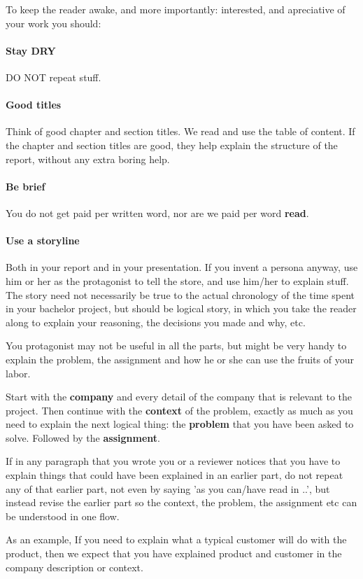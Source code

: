 To keep the reader awake, and more importantly: interested, and apreciative of your work you should:
\paragraph{Stay DRY} DO NOT repeat stuff.
\paragraph{Good titles} Think of good chapter and section titles. We read and use the table of content. If the chapter and section titles are good, they help explain the structure of the report, without any extra boring help.
\paragraph{Be brief} You do not get paid per written word, nor are we paid per word \textbf{read}.
\paragraph{Use a storyline} Both in your report and in your presentation. If you invent a persona anyway, use him or her as the protagonist to tell the store, and use him/her to explain stuff.
The story need not necessarily be true to the actual chronology of the time spent in your bachelor project, but should be logical story, in which you take the reader along to explain your reasoning, the decisions you made and why, etc.

You protagonist may not be useful in all the parts, but might be very handy to explain the problem, the assignment and how he or she can use the fruits of your labor.

Start with the \textbf{company} and every detail of the company that is relevant to the project.
Then continue with the \textbf{context} of the problem, exactly as much as you need to explain the next logical thing: the \textbf{problem} that you have been asked to solve. Followed by the \textbf{assignment}.

If in any paragraph that you wrote you or a reviewer notices that you have to explain things
that could have been explained in an earlier part, do not repeat any of that earlier part,
not even by saying 'as you can/have read in ..', but instead revise the earlier part so the context, the problem, the assignment etc can be understood in one flow.

As an example, If you need to explain what a typical customer will do with the product, then we expect that you have explained product and customer in the company description or context.

